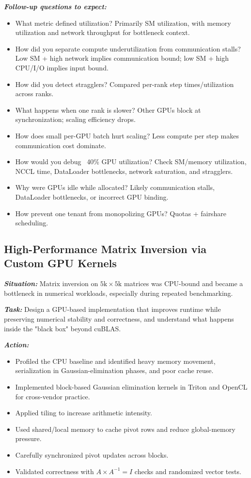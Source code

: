 \documentclass[12pt]{article}
\let\origtextbf\textbf
\renewcommand{\textbf}[1]{\origtextbf{\textit{#1}}}
\begin{document}
\textbf{Follow-up questions to expect:}
\begin{itemize}
\item What metric defined utilization? Primarily SM utilization, with memory utilization and network throughput for bottleneck context.
\item How did you separate compute underutilization from communication stalls? Low SM + high network implies communication bound; low SM + high CPU/I/O implies input bound.
\item How did you detect stragglers? Compared per-rank step times/utilization across ranks.
\item What happens when one rank is slower? Other GPUs block at synchronization; scaling efficiency drops.
\item How does small per-GPU batch hurt scaling? Less compute per step makes communication cost dominate.
\item How would you debug ~40\% GPU utilization? Check SM/memory utilization, NCCL time, DataLoader bottlenecks, network saturation, and stragglers.
\item Why were GPUs idle while allocated? Likely communication stalls, DataLoader bottlenecks, or incorrect GPU binding.
\item How prevent one tenant from monopolizing GPUs? Quotas + fairshare scheduling.
\end{itemize}

\subsection{High-Performance Matrix Inversion via Custom GPU Kernels}
\textbf{Situation:}
Matrix inversion on \(5\text{k}\times5\text{k}\) matrices was CPU-bound and became a bottleneck in numerical workloads, especially during repeated benchmarking.

\textbf{Task:}
Design a GPU-based implementation that improves runtime while preserving numerical stability and correctness, and understand what happens inside the "black box" beyond cuBLAS.

\textbf{Action:}
\begin{itemize}
\item Profiled the CPU baseline and identified heavy memory movement, serialization in Gaussian-elimination phases, and poor cache reuse.
\item Implemented block-based Gaussian elimination kernels in Triton and OpenCL for cross-vendor practice.
\item Applied tiling to increase arithmetic intensity.
\item Used shared/local memory to cache pivot rows and reduce global-memory pressure.
\item Carefully synchronized pivot updates across blocks.
\item Validated correctness with \(A\times A^{-1}=I\) checks and randomized vector tests.
\end{itemize}
\end{document}
